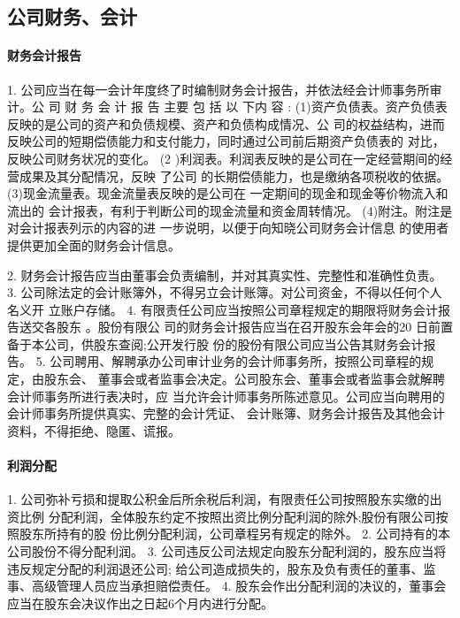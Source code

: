 \documentclass[UTF8,12pt]{ctexart}
\numberwithin{equation}{section} %
\numberwithin{figure}{section}
\numberwithin{table}{section}
\begin{document}
	
	\subsection{公司财务、会计}
	\paragraph{财务会计报告}
	1. 公司应当在每一会计年度终了时编制财务会计报告，并依法经会计师事务所审计。公 司 财 务 会 计 报 告 主要 包 括 以 下内 容 : (1)资产负债表。资产负债表反映的是公司的资产和负债规模、资产和负债构成情况、公 司的权益结构，进而反映公司的短期偿债能力和支付能力，同时通过公司前后期资产负债表的 对比，反映公司财务状况的变化。
	(2 )利润表。利润表反映的是公司在一定经营期间的经营成果及其分配情况，反映 了公司 的长期偿债能力，也是缴纳各项税收的依据。
	(3)现金流量表。现金流量表反映的是公司在 一定期间的现金和现金等价物流入和流出的 会计报表，有利于判断公司的现金流量和资金周转情况。 (4)附注。附注是对会计报表列示的内容的进 一步说明，以便于向知晓公司财务会计信息 的使用者提供更加全面的财务会计信息。
	
	2. 财务会计报告应当由董事会负责编制，并对其真实性、完整性和准确性负责。
	3. 公司除法定的会计账簿外，不得另立会计账簿。对公司资金，不得以任何个人名义开 立账户存储。
	4. 有限责任公司应当按照公司章程规定的期限将财务会计报告送交各股东 。股份有限公 司的财务会计报告应当在召开股东会年会的20 日前置备于本公司，供股东查阅;公开发行股 份的股份有限公司应当公告其财务会计报告。
	5. 公司聘用、解聘承办公司审计业务的会计师事务所，按照公司章程的规定，由股东会、 董事会或者监事会决定。公司股东会、董事会或者监事会就解聘会计师事务所进行表决时，应 当允许会计师事务所陈述意见。公司应当向聘用的会计师事务所提供真实、完整的会计凭证、 会计账簿、财务会计报告及其他会计资料，不得拒绝、隐匿、谎报。
	
	\paragraph{利润分配}
	1. 公司弥补亏损和提取公积金后所余税后利润，有限责任公司按照股东实缴的出资比例 分配利润，全体股东约定不按照出资比例分配利润的除外;股份有限公司按照股东所持有的股 份比例分配利润，公司章程另有规定的除外。
	2. 公司持有的本公司股份不得分配利润。
	3. 公司违反公司法规定向股东分配利润的，股东应当将违反规定分配的利润退还公司; 给公司造成损失的，股东及负有责任的董事、监事、高级管理人员应当承担赔偿责任。
	4. 股东会作出分配利润的决议的，董事会应当在股东会决议作出之日起6个月内进行分配。
	
\end{document}
